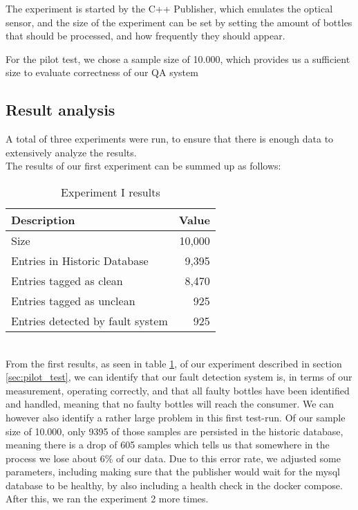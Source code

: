 The experiment is started by the C++ Publisher, which emulates the optical sensor, and the size of the experiment can be set by setting the amount of bottles that should be processed, and how frequently they should appear.

For the pilot test, we chose a sample size of 10.000, which provides us a sufficient size to evaluate correctness of our QA system



\subsection{Result analysis}
\label{sec:analysis}
A total of three experiments were run, to ensure that there is enough data to extensively analyze the results.\\
The results of our first experiment can be summed up as follows:
\begin{table}[h]
    \centering
    \caption{Experiment I results}
    \begin{tabular}{lr}
        \toprule
        \textbf{Description} & \textbf{Value} \\
        \midrule
        Size & 10,000 \\
        Entries in Historic Database & 9,395 \\
        Entries tagged as clean & 8,470 \\
        Entries tagged as unclean & 925 \\
        Entries detected by fault system & 925 \\
        \bottomrule
    \end{tabular}
    \label{tab:ExpI}
\end{table}
\\
From the first results, as seen in table \ref{tab:ExpI}, of our experiment described in section \ref{sec:pilot_test}, we can identify that our fault detection system is, in terms of our measurement, operating correctly, and that all faulty bottles have been identified and handled, meaning that no faulty bottles will reach the consumer. We can however also identify a rather large problem in this first test-run. Of our sample size of 10.000, only 9395 of those samples are persisted in the historic database, meaning there is a drop of 605 samples which tells us that somewhere in the process we lose about 6\% of our data. Due to this error rate, we adjusted some parameters, including making sure that the publisher would wait for the mysql database to be healthy, by also including a health check in the docker compose. After this, we ran the experiment 2 more times. 
